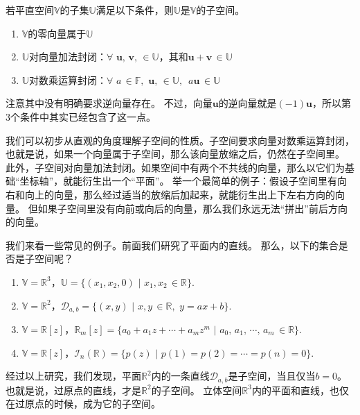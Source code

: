 \documentclass[12pt,UTF8]{ctexbook}
\begin{document}
\begin{pp}\label{pp:1_6}
    若平直空间$\mathbb{V}$的子集$\mathbb{U}$满足以下条件，则$\mathbb{U}$是$\mathbb{V}$的子空间。
    \begin{enumerate}
        \item $\mathbb{V}$的零向量属于$\mathbb{U}$
        \item $\mathbb{U}$对向量加法封闭：$\forall \,\, \mathbf{u}, \, \mathbf{v}, \, \in \mathbb{U}$，其和$\mathbf{u} + \mathbf{v} \, \in \mathbb{U}$
        \item $\mathbb{U}$对数乘运算封闭：$\forall \,\, a \, \in \mathbb{F}, \,\, \mathbf{u}, \, \in \mathbb{U}, \,\,\, a\mathbf{u} \, \in \mathbb{U}$
    \end{enumerate}
\end{pp}

注意其中没有明确要求逆向量存在。
不过，向量$\mathbf{u}$的逆向量就是$(-1)\mathbf{u}$，所以第3个条件中其实已经包含了这一点。

我们可以初步从直观的角度理解子空间的性质。子空间要求向量对数乘运算封闭，也就是说，如果一个向量属于子空间，那么该向量放缩之后，仍然在子空间里。
此外，子空间对向量加法封闭。如果空间中有两个不共线的向量，那么以它们为基础“坐标轴”，就能衍生出一个“平面”。
举一个最简单的例子：假设子空间里有向右和向上的向量，那么经过适当的放缩后加起来，就能衍生出上下左右方向的向量。
但如果子空间里没有向前或向后的向量，那么我们永远无法“拼出”前后方向的向量。

我们来看一些常见的例子。前面我们研究了平面内的直线。
那么，以下的集合是否是子空间呢？
\begin{enumerate}
    \item $\mathbb{V} = \mathbb{R}^3$，$\mathbb{U} = \{(x_1, x_2, 0) \,\, | \,\, x_1, x_2 \, \in \mathbb{R}\}$.
    \item $\mathbb{V} = \mathbb{R}^2$，$\mathcal{D}_{a,b} = \{(x, y) \,\, | \,\, x, y \, \in \mathbb{R}, \,\, y = ax + b\}$.
    \item $\mathbb{V} = \mathbb{R}[z]$，$\mathbb{R}_m[z] = \{a_0 + a_1 z + \cdots + a_m z^m \,\, | \,\, a_0,\, a_1,\, \cdots ,\, a_m \, \in \mathbb{R}\}$.
    \item $\mathbb{V} = \mathbb{R}[z]$，$\mathcal{I}_n (\mathbb{R}) = \{p(z) \,\, | \,\, p(1) = p(2) = \cdots = p(n) = 0 \}$.
\end{enumerate}

经过以上研究，我们发现，平面$\mathbb{R}^2$内的一条直线$\mathcal{D}_{a,b}$是子空间，当且仅当$b = 0$。
也就是说，过原点的直线，才是$\mathbb{R}^2$的子空间。
立体空间$\mathbb{R}^3$内的平面和直线，也仅在过原点的时候，成为它的子空间。
\end{document}
